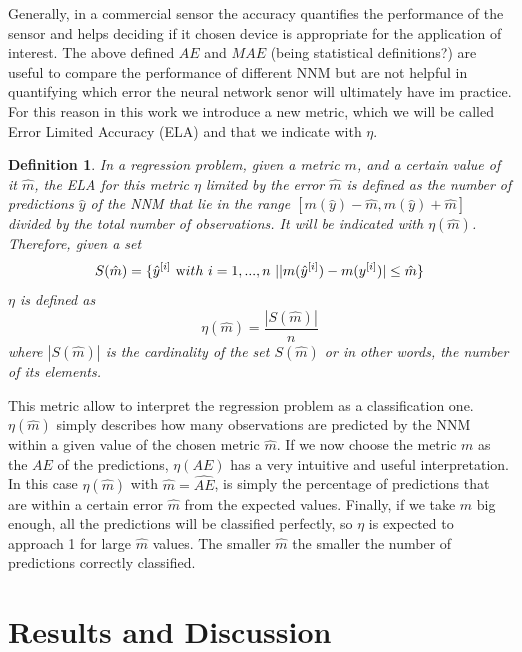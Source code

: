\documentclass[9pt,twocolumn,twoside,pdftex]{optica}
\newtheorem*{definition*}{Definition}
\begin{document}
Generally, in a commercial sensor the accuracy quantifies the performance of the sensor and helps deciding if it chosen device is appropriate for the application of interest. The above defined $AE$ and $MAE$ (being statistical definitions?) are useful to compare the performance of different NNM but are not helpful in quantifying which error the neural network senor will ultimately have im practice.
For this reason in this work we introduce a new metric, which we will be called Error Limited Accuracy (ELA) and that we indicate with $\eta$.

\begin{definition*}
In a regression problem, given a metric $m$, and a certain value of it $\hat m$, the ELA for this metric $\eta$ limited by the error $\hat m$ is defined as the number of predictions $\hat y$ of the NNM that lie in the range $[m(\hat y)-\hat m, m(\hat y)+\hat m]$ divided by the total number of observations. It will be indicated with $\eta(\hat m)$. Therefore, given a set
\begin{equation}
S(\hat m) = \{ \hat y^{[i]} \ {\text with } \ i = 1,..., n\ | |m(\hat y^{[i]})-m(y^{[i]})|\leq \hat m \} 
\end{equation}
$\eta$ is defined as
\begin{equation}
\eta(\hat m) = \frac{|S(\hat m)|}{n}
\end{equation}
where $|S(\hat m)|$ is the cardinality of the set $S(\hat m)$ or in other words, the number of its elements.
\end{definition*}

This metric allow to interpret the regression problem as a classification one. $\eta(\hat m)$ simply describes how many observations are predicted by the NNM within a given value of the chosen metric $\hat m$. If we now choose the metric $m$ as the $AE$ of the predictions, $\eta(AE)$ has a very intuitive and useful interpretation. 
In this case $\eta(\hat{m})$ with $\hat m = \hat{AE}$, is simply the percentage of predictions that are within a certain error $\hat m$ from the expected values. Finally, if we take $\hat m$ big enough, all the predictions will be classified perfectly, so $\eta$ is expected to approach 1 for large $\hat m$ values. The smaller $\hat m$ the smaller the number of predictions correctly classified. 


\section{Results and Discussion}
\label{Results}
\end{document}
